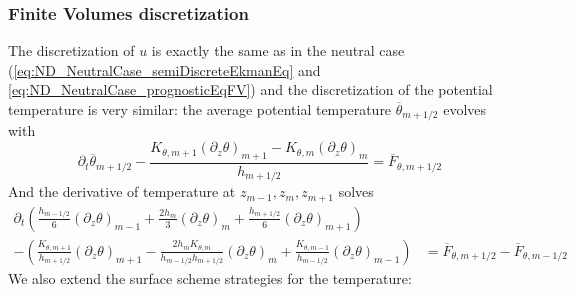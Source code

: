 \subsubsection{Finite Volumes discretization}
The discretization of $u$ is exactly the same as in the
neutral case (\eqref{eq:ND_NeutralCase_semiDiscreteEkmanEq} and \eqref{eq:ND_NeutralCase_prognosticEqFV}) and the discretization of 
the potential temperature is very similar:
the average potential temperature $\overline{\theta}_{m+1/2}$
evolves with
\begin{equation}
\label{eq:ND_StratifiedCase_semiDiscreteEkmanEqPT}
    \partial_t \overline{\theta}_{m+1/2}
    - \frac{K_{\theta, m+1} {(\partial_z \theta)}_{m+1} - K_{\theta, m} {(\partial_z \theta)}_m}{h_{m+1/2}}
	= \overline{F}_{\theta, m+1/2}
\end{equation}
And the derivative of temperature at $z_{m-1}, z_m, z_{m+1}$ solves
\begin{equation}
\begin{aligned}
\label{eq:ND_StratifiedCase_prognosticPT_FV}
\partial_t \left( \frac{h_{m-1/2}}{6} {(\partial_z \theta)}_{m-1} 
+ \frac{2h_m}{3} {(\partial_z \theta)}_m  
+ \frac{h_{m+1/2}}{6} {(\partial_z \theta)}_{m+1} \right)& \\
-
    \left(
	\frac{K_{\theta, m+1}}{ h_{m+1/2}}{(\partial_z \theta)}_{m+1} - \frac{2 h_m K_{\theta, m}}{h_{m-1/2} h _{m+1/2}}{(\partial_z \theta)}_m + \frac{K_{\theta, m-1}}{ h_{m-1/2}}{(\partial_z \theta)}_{m-1}
    \right)
	&= \overline{F}_{\theta, m+1/2} - \overline{F}_{\theta, m-1/2}
\end{aligned}
\end{equation}
We also extend the surface scheme strategies for the temperature:
